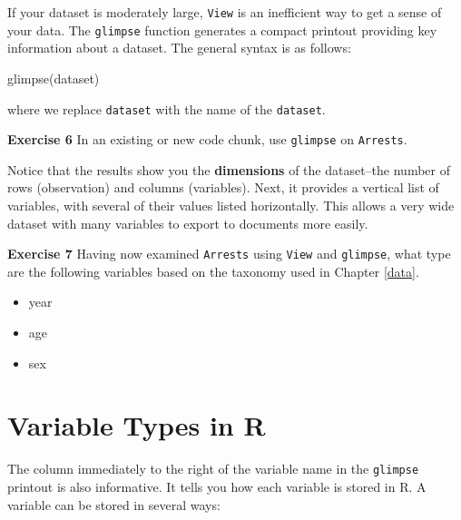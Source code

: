 \documentclass[
]{book}
\makeatletter
\newenvironment{Shaded}{\begin{snugshade}}{\end{snugshade}}
\newcommand{\FunctionTok}[1]{\textcolor[rgb]{0,0,0}{#1}}
\newcommand{\NormalTok}[1]{#1}
\providecommand{\tightlist}{%
  \setlength{\itemsep}{0pt}\setlength{\parskip}{0pt}}
\newenvironment{kframe}{%
\medskip{}
\setlength{\fboxsep}{.8em}
 \def\at@end@of@kframe{}%
 \ifinner\ifhmode%
  \def\at@end@of@kframe{\end{minipage}}%
  \begin{minipage}{\columnwidth}%
 \fi\fi%
 \def\FrameCommand##1{\hskip\@totalleftmargin \hskip-\fboxsep
 \colorbox{shadecolor}{##1}\hskip-\fboxsep
     \hskip-\linewidth \hskip-\@totalleftmargin \hskip\columnwidth}%
 \MakeFramed {\advance\hsize-\width
   \@totalleftmargin\z@ \linewidth\hsize
   \@setminipage}}%
 {\par\unskip\endMakeFramed%
 \at@end@of@kframe}
\renewenvironment{Shaded}{\begin{kframe}}{\end{kframe}}
\newenvironment{rmdblock}[1]
  {\begin{shaded*}
  }
  {\end{shaded*}
  }
\newenvironment{learncheck}
  {\begin{rmdblock}{warning}}
  {\end{rmdblock}}
\makeatother
\begin{document}
If your dataset is moderately large, \texttt{View} is an inefficient way to get a sense of your data. The \texttt{glimpse} function generates a compact printout providing key information about a dataset. The general syntax is as follows:

\begin{Shaded}
\begin{Highlighting}[]
\FunctionTok{glimpse}\NormalTok{(dataset)}
\end{Highlighting}
\end{Shaded}

where we replace \texttt{dataset} with the name of the \texttt{dataset}.

\begin{learncheck}
\textbf{Exercise 6} In an existing or new code chunk, use
\texttt{glimpse} on \texttt{Arrests}.
\end{learncheck}

Notice that the results show you the \textbf{dimensions} of the dataset--the number of rows (observation) and columns (variables). Next, it provides a vertical list of variables, with several of their values listed horizontally. This allows a very wide dataset with many variables to export to documents more easily.

\begin{learncheck}
\textbf{Exercise 7} Having now examined \texttt{Arrests} using
\texttt{View} and \texttt{glimpse}, what type are the following
variables based on the taxonomy used in Chapter \ref{data}.

\begin{itemize}
\tightlist
\item
  year
\item
  age
\item
  sex
\end{itemize}
\end{learncheck}

\hypertarget{variable-types-in-r}{%
\section{Variable Types in R}\label{variable-types-in-r}}

The column immediately to the right of the variable name in the \texttt{glimpse} printout is also informative. It tells you how each variable is stored in R. A variable can be stored in several ways:
\end{document}
